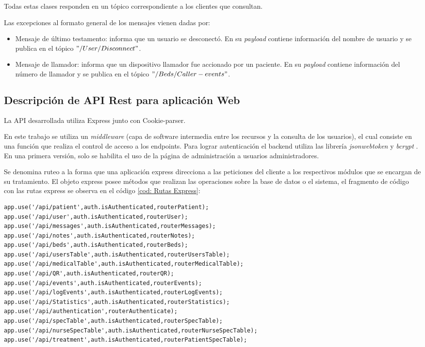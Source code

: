 Todas estas clases responden en un tópico correspondiente a los clientes que consultan.

Las excepciones al formato general de los mensajes vienen dadas por:
\begin{itemize}
\item Mensaje de último testamento: informa que un usuario se desconectó. En su \textit{payload} contiene información del nombre de usuario y se publica en el tópico $"/User/Disconnect"$.
\item Mensaje de llamador: informa que un dispositivo llamador fue accionado por un paciente. En su \textit{payload} contiene información del número de llamador y se publica en el tópico $"/Beds/Caller-events"$.

\end{itemize}


\pagebreak

\subsection{Descripción de API Rest para aplicación Web}

La API desarrollada utiliza Express junto con Cookie-parser. 
 
En este trabajo se utiliza un \textit{middleware} (capa de software intermedia entre los recursos y la consulta de los usuarios), el cual consiste en una función que realiza el control de acceso a los endpoints. Para lograr autenticación el backend utiliza las librería \textit{jsonwebtoken} \citep{WEBSITE:32} y \textit{bcrypt} \citep{WEBSITE:31}. En una primera versión, solo se habilita el uso de la página de administración a usuarios administradores.

Se denomina ruteo a la forma que una aplicación express direcciona a las peticiones del cliente a los respectivos módulos que se encargan de su tratamiento.%
El objeto express posee métodos que realizan las operaciones sobre la base de datos o el sistema, el fragmento de código con las rutas express se observa en el código \ref{cod: Rutas Express}:

\begin{lstlisting}[label=cod:Rutas Express,caption=  Rutas express]
app.use('/api/patient',auth.isAuthenticated,routerPatient);
app.use('/api/user',auth.isAuthenticated,routerUser);
app.use('/api/messages',auth.isAuthenticated,routerMessages);
app.use('/api/notes',auth.isAuthenticated,routerNotes);
app.use('/api/beds',auth.isAuthenticated,routerBeds);
app.use('/api/usersTable',auth.isAuthenticated,routerUsersTable);
app.use('/api/medicalTable',auth.isAuthenticated,routerMedicalTable);
app.use('/api/QR',auth.isAuthenticated,routerQR);
app.use('/api/events',auth.isAuthenticated,routerEvents);
app.use('/api/logEvents',auth.isAuthenticated,routerLogEvents);
app.use('/api/Statistics',auth.isAuthenticated,routerStatistics);
app.use('/api/authentication',routerAuthenticate);
app.use('/api/specTable',auth.isAuthenticated,routerSpecTable);
app.use('/api/nurseSpecTable',auth.isAuthenticated,routerNurseSpecTable);
app.use('/api/treatment',auth.isAuthenticated,routerPatientSpecTable);
\end{lstlisting}

